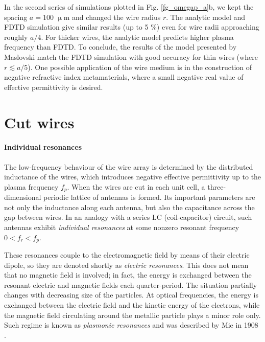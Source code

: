 In the second series of simulations plotted in Fig.  \ref{fg_omegap_a}b, we kept the spacing $a = 100$ $\upmu$m and changed the wire radius $r$. The analytic model and FDTD simulation give similar results (up to 5 \%) even for wire radii approaching roughly $a/4$. For thicker wires, the analytic model predicts higher plasma frequency than FDTD.  To conclude, the results of the model presented by Maslovski match the FDTD simulation with good accuracy for thin wires (where $r \lesssim a/5$). One possible application of the wire medium is in the construction of negative refractive index metamaterials, where a small negative real value of effective permittivity is desired.%


\FloatBarrier %
\section{Cut wires} \label{section_cutwires}%
\paragraph{Individual resonances}%
The low-frequency behaviour of the wire array is determined by the distributed inductance of the wires, which introduces negative effective permittivity up to the plasma frequency $f_p$. When the wires are cut in each unit cell, a three-dimensional periodic lattice of antennas is formed. Its important parameters are not only the inductance along each antenna, but also the capacitance across the gap between wires. In an analogy with a series LC (coil-capacitor) circuit, such antennas exhibit \textit{individual resonances} at some nonzero resonant frequency $0<f_r<f_p$. 

These resonances couple to the electromagnetic field by means of their electric dipole, so they are denoted shortly as \textit{electric resonances}. This does not mean that no magnetic field is involved; in fact, the energy is exchanged between the resonant electric and magnetic fields each quarter-period. The situation partially changes with decreasing size of the particles. At optical frequencies, the energy is exchanged between the electric field and the kinetic energy of the electrons, while the magnetic field circulating around the metallic particle plays a minor role only. Such regime is known as \textit{plasmonic resonances} and was described by Mie in 1908 \cite{mie1908beitrage}.

